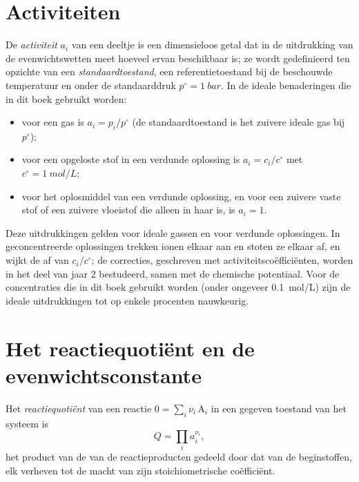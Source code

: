 \section{Activiteiten}

\begin{definition}\label{def:b1:extent-q-and-k:activity}
De \emph{activiteit} $a_i$ van een deeltje is een
dimensieloos getal dat in de uitdrukking van de evenwichtswetten meet
hoeveel ervan beschikbaar is; ze wordt gedefinieerd ten opzichte van een
\emph{standaardtoestand}, een referentietoestand
bij de beschouwde temperatuur en onder de standaarddruk
$p^\circ = \qty{1}{bar}$. In de ideale benaderingen die in dit boek
gebruikt worden:
\begin{itemize}
  \item voor een gas is $a_i = p_i/p^\circ$ (de standaardtoestand is het
        zuivere ideale gas bij $p^\circ$);
  \item voor een opgeloste stof in een verdunde oplossing is
        $a_i = c_i/c^\circ$ met $c^\circ = \qty{1}{mol/L}$;
  \item voor het oplosmiddel van een verdunde oplossing, en voor een
        zuivere vaste stof of een zuivere vloeistof die alleen in haar 
        is, is $a_i = 1$.
\end{itemize}
\end{definition}


\begin{remark}\label{rem:b1:extent-q-and-k:ideal}
Deze uitdrukkingen gelden voor ideale gassen en voor verdunde
oplossingen. In geconcentreerde oplossingen trekken ionen elkaar aan en
stoten ze elkaar af, en wijkt de  af van $c_i/c^\circ$; de
correcties, geschreven met activiteitscoëfficiënten, worden in het deel
van jaar 2 bestudeerd, samen met de chemische potentiaal. Voor de
concentraties die in dit boek gebruikt worden (onder ongeveer
\qty{0.1}{mol/L}) zijn de ideale uitdrukkingen tot op enkele procenten
nauwkeurig.
\end{remark}

\section{Het reactiequotiënt en de evenwichtsconstante}

\begin{definition}[Reactiequotiënt]\label{def:b1:extent-q-and-k:quotient}
Het \emph{reactiequotiënt} van een
reactie $0 = \sum_i \nu_i\,\mathrm{A}_i$ in een gegeven toestand van het
systeem is
\[
  Q = \prod_i a_i^{\nu_i} ,
\]
het product van de  van de reactieproducten gedeeld door dat
van de beginstoffen, elk verheven tot de macht van zijn stoichiometrische
coëfficiënt.
\end{definition}

